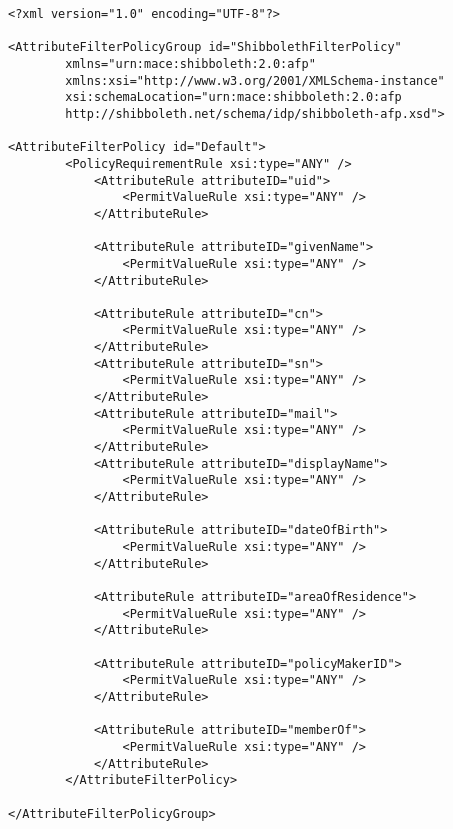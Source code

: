 \begin{verbatim}
<?xml version="1.0" encoding="UTF-8"?>

<AttributeFilterPolicyGroup id="ShibbolethFilterPolicy"
        xmlns="urn:mace:shibboleth:2.0:afp"
        xmlns:xsi="http://www.w3.org/2001/XMLSchema-instance"
        xsi:schemaLocation="urn:mace:shibboleth:2.0:afp 
        http://shibboleth.net/schema/idp/shibboleth-afp.xsd">

<AttributeFilterPolicy id="Default">
        <PolicyRequirementRule xsi:type="ANY" />
			<AttributeRule attributeID="uid">
				<PermitValueRule xsi:type="ANY" />
			</AttributeRule>

			<AttributeRule attributeID="givenName">
				<PermitValueRule xsi:type="ANY" />
			</AttributeRule>

			<AttributeRule attributeID="cn">
				<PermitValueRule xsi:type="ANY" />
			</AttributeRule>
			<AttributeRule attributeID="sn">
				<PermitValueRule xsi:type="ANY" />
			</AttributeRule>
			<AttributeRule attributeID="mail">
				<PermitValueRule xsi:type="ANY" />
			</AttributeRule>
			<AttributeRule attributeID="displayName">
				<PermitValueRule xsi:type="ANY" />
			</AttributeRule>
			
			<AttributeRule attributeID="dateOfBirth">
				<PermitValueRule xsi:type="ANY" />
			</AttributeRule>

			<AttributeRule attributeID="areaOfResidence">
				<PermitValueRule xsi:type="ANY" />
			</AttributeRule>

			<AttributeRule attributeID="policyMakerID">
				<PermitValueRule xsi:type="ANY" />
			</AttributeRule>
			
			<AttributeRule attributeID="memberOf">
				<PermitValueRule xsi:type="ANY" />
			</AttributeRule>
		</AttributeFilterPolicy>    

</AttributeFilterPolicyGroup>

\end{verbatim}

